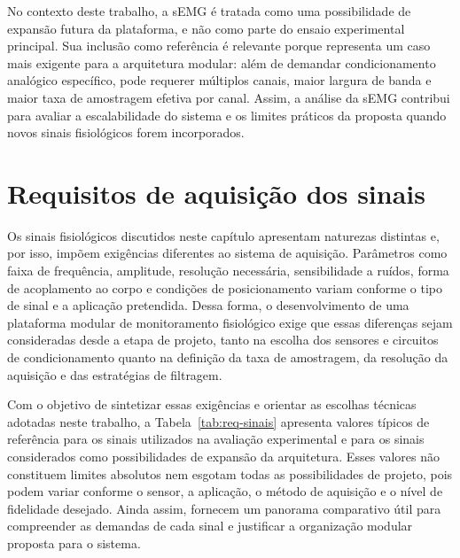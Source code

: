 \documentclass[a4paper,12pt]{fcte}
\begin{document}
No contexto deste trabalho, a sEMG é tratada como uma possibilidade de expansão futura da plataforma, e não como parte do ensaio experimental principal. Sua inclusão como referência é relevante porque representa um caso mais exigente para a arquitetura modular: além de demandar condicionamento analógico específico, pode requerer múltiplos canais, maior largura de banda e maior taxa de amostragem efetiva por canal. Assim, a análise da sEMG contribui para avaliar a escalabilidade do sistema e os limites práticos da proposta quando novos sinais fisiológicos forem incorporados.

\section{Requisitos de aquisição dos sinais}

Os sinais fisiológicos discutidos neste capítulo apresentam naturezas distintas e, por isso, impõem exigências diferentes ao sistema de aquisição. Parâmetros como faixa de frequência, amplitude, resolução necessária, sensibilidade a ruídos, forma de acoplamento ao corpo e condições de posicionamento variam conforme o tipo de sinal e a aplicação pretendida. Dessa forma, o desenvolvimento de uma plataforma modular de monitoramento fisiológico exige que essas diferenças sejam consideradas desde a etapa de projeto, tanto na escolha dos sensores e circuitos de condicionamento quanto na definição da taxa de amostragem, da resolução da aquisição e das estratégias de filtragem.

Com o objetivo de sintetizar essas exigências e orientar as escolhas técnicas adotadas neste trabalho, a Tabela~\ref{tab:req-sinais} apresenta valores típicos de referência para os sinais utilizados na avaliação experimental e para os sinais considerados como possibilidades de expansão da arquitetura. Esses valores não constituem limites absolutos nem esgotam todas as possibilidades de projeto, pois podem variar conforme o sensor, a aplicação, o método de aquisição e o nível de fidelidade desejado. Ainda assim, fornecem um panorama comparativo útil para compreender as demandas de cada sinal e justificar a organização modular proposta para o sistema.
\end{document}
